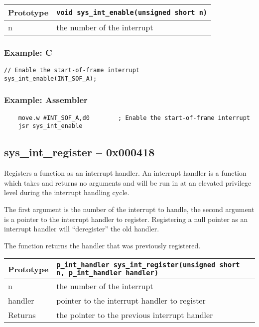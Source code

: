 \bigskip

\begin{tabular}{|l||l|} \hline
Prototype & \lstinline!void sys_int_enable(unsigned short n)! \\ \hline
n & the number of the interrupt \\ \hline
\end{tabular}

\subsubsection*{Example: C}
\begin{lstlisting}
// Enable the start-of-frame interrupt
sys_int_enable(INT_SOF_A);
\end{lstlisting}

\subsubsection*{Example: Assembler}
\begin{verbatim}
    move.w #INT_SOF_A,d0        ; Enable the start-of-frame interrupt
    jsr sys_int_enable
\end{verbatim}

\subsection*{sys\_int\_register -- 0x000418}
Registers a function as an interrupt handler. An interrupt handler is a function which takes and returns no arguments and will be
run in at an elevated privilege level during the interrupt handling cycle.

The first argument is the number of the interrupt to handle, the second argument is a pointer to the interrupt handler to register.
Registering a null pointer as an interrupt handler will ``deregister'' the old handler.

The function returns the handler that was previously registered.

\begin{tabular}{|l||l|} \hline
Prototype & \lstinline!p_int_handler sys_int_register(unsigned short n, p_int_handler handler)! \\ \hline
n & the number of the interrupt \\ \hline
handler & pointer to the interrupt handler to register \\ \hline
Returns & the pointer to the previous interrupt handler \\ \hline
\end{tabular}


